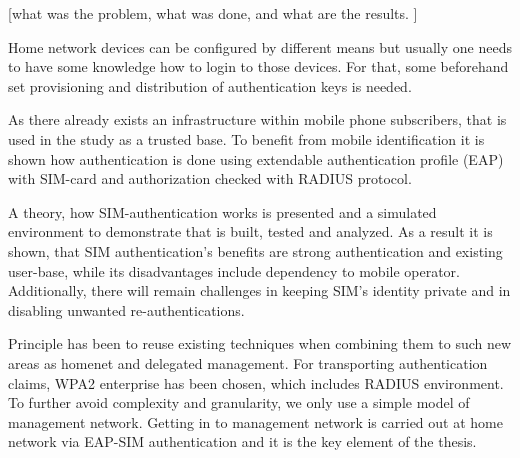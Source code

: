 \documentclass[12pt,a4paper,english]{tutthesis}
\begin{document}
[what was the problem, what was done, and what are the results. ]


Home network devices can be configured by different means but usually one needs 
to have some knowledge how to login to those devices. For that, 
some beforehand set provisioning and distribution of authentication keys is needed.

As there already exists an infrastructure within mobile phone subscribers,
that is used in the study as a trusted base.
To benefit from mobile identification it is shown how
 authentication  is done using extendable authentication profile (EAP) with SIM-card
and authorization checked with RADIUS protocol.




A theory, how SIM-authentication works is presented and a simulated environment
to demonstrate that is built, tested and analyzed.
As a result it is shown, that SIM authentication's benefits are strong
authentication and existing user-base, while its disadvantages include
dependency to mobile operator. Additionally, there will remain challenges in keeping SIM's identity private and in disabling unwanted re-authentications. 

Principle has been to reuse existing techniques when combining them to such new areas as homenet and delegated management.
 For transporting authentication claims, WPA2 enterprise has been chosen, which includes RADIUS environment.
To further avoid complexity and granularity, we
only use a simple model of management network. Getting in to management network is carried out at home network via EAP-SIM authentication and it is the key element of the thesis.



\end{document}
